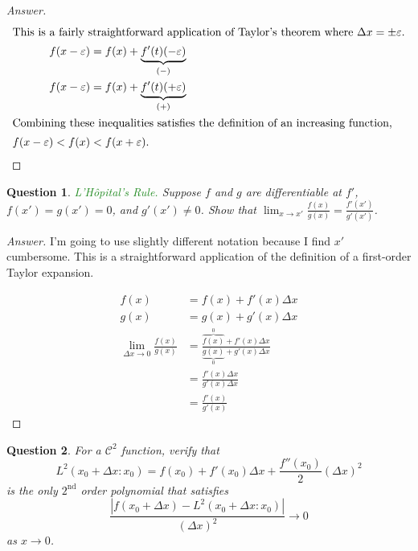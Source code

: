 \documentclass[11pt]{article}
\newtheorem{question}{Question}
\newcommand{\gr}{\textcolor{ForestGreen}}
\begin{document}
\begin{proof}[Answer]
\begin{align*}
\intertext{This is a fairly straightforward application of Taylor's theorem where $\Delta x = \pm \varepsilon.$}
f(x - \varepsilon) &= f(x) + \underbrace{f'(t)(-\varepsilon)}_{(-)}\\
f(x - \varepsilon) &= f(x) + \underbrace{f'(t)(+\varepsilon)}_{(+)}\\
\intertext{Combining these inequalities satisfies the definition of an increasing function,}
f(x - \varepsilon) < f(x) &< f(x + \varepsilon).
\end{align*}
\end{proof}
\begin{question}
\gr{L'H\^opital's Rule.} Suppose $f$ and $g$ are differentiable at $f'$, $f(x') = g(x') = 0$, and $g'(x') \ne 0$. Show that $\lim_{x \to x'} \frac{f(x)}{g(x)} = \frac{f'(x')}{g'(x')}$.
\end{question}
\begin{proof}[Answer]
I'm going to use slightly different notation because I find $x'$ cumbersome. This is a straightforward application of the definition of a first-order Taylor expansion.

\begin{align*}
f(x) &= f(x) + f'(x) \Delta x \\
g(x) &= g(x) + g'(x) \Delta x \\
\lim_{\Delta x \to 0} \frac{f(x)}{g(x)} &= \frac{\overbrace{f(x)}^0 + f'(x) \Delta x}{\underbrace{g(x)}_0 + g'(x) \Delta x}\\
&= \frac{f'(x) \Delta x}{g'(x) \Delta x}\\
&= \frac{f'(x)}{g'(x)}
\end{align*}
\end{proof}
\begin{question}
For a $\mathcal{C}^2$ function, verify that
\[
L^2(x_0 + \Delta x: x_0) = f(x_0) + f'(x_0) \Delta x + \frac{f''(x_0)}{2}(\Delta x)^2
\]
 is the only $2^{\text{nd}}$ order polynomial that satisfies
\[
\frac{|f(x_0 + \Delta x) - L^2(x_0 + \Delta x: x_0)|}{(\Delta x)^2} \to 0
\]
as $x \to 0$.
\end{question}
\end{document}
